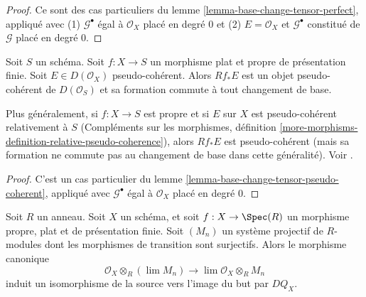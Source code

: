 \begin{proof}
Ce sont des cas particuliers du
lemme \ref{lemma-base-change-tensor-perfect}, appliqué avec
(1) $\mathcal{G}^\bullet$ égal à $\mathcal{O}_X$ placé en degré $0$
et (2) $E = \mathcal{O}_X$ et $\mathcal{G}^\bullet$ constitué de
$\mathcal{G}$ placé en degré $0$.
\end{proof}

\begin{lemma}
\label{lemma-flat-proper-pseudo-coherent-direct-image-general}
Soit $S$ un schéma. Soit $f : X \to S$ un morphisme plat et propre
de présentation finie. Soit $E \in D(\mathcal{O}_X)$
pseudo-cohérent. Alors $Rf_*E$ est un objet pseudo-cohérent de
$D(\mathcal{O}_S)$ et sa formation commute à tout changement de base.
\end{lemma}

\noindent
Plus généralement, si $f : X \to S$ est propre et si $E$ sur $X$ est pseudo-cohérent
relativement à $S$ (Compléments sur les morphismes, définition
\ref{more-morphisms-definition-relative-pseudo-coherence}),
alors $Rf_*E$ est pseudo-cohérent
(mais sa formation ne commute pas au changement de base dans cette généralité).
Voir \cite{Kiehl}.

\begin{proof}
C'est un cas particulier du
lemme \ref{lemma-base-change-tensor-pseudo-coherent}, appliqué avec
$\mathcal{G}^\bullet$ égal à $\mathcal{O}_X$ placé en degré $0$.
\end{proof}

\begin{lemma}
\label{lemma-pullback-and-limits}
Soit $R$ un anneau. Soit $X$ un schéma, et soit
$f : X \to \Spec(R)$ un morphisme propre, plat et
de présentation finie. Soit $(M_n)$ un système projectif
de $R$-modules dont les morphismes de transition sont surjectifs.
Alors le morphisme canonique
$$
\mathcal{O}_X \otimes_R (\lim M_n)
\longrightarrow
\lim \mathcal{O}_X \otimes_R M_n
$$
induit un isomorphisme de la source vers l'image du but par $DQ_X$.
\end{lemma}

